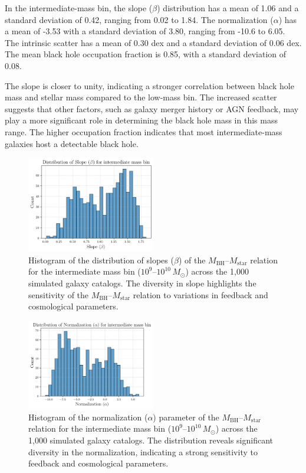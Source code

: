 \documentclass[twocolumn]{aastex631}
\begin{document}
In the intermediate-mass bin, the slope ($\beta$) distribution has a mean of 1.06 and a standard deviation of 0.42, ranging from 0.02 to 1.84. The normalization ($\alpha$) has a mean of -3.53 with a standard deviation of 3.80, ranging from -10.6 to 6.05. The intrinsic scatter has a mean of 0.30 dex and a standard deviation of 0.06 dex. The mean black hole occupation fraction is 0.85, with a standard deviation of 0.08.

The slope is closer to unity, indicating a stronger correlation between black hole mass and stellar mass compared to the low-mass bin. The increased scatter suggests that other factors, such as galaxy merger history or AGN feedback, may play a more significant role in determining the black hole mass in this mass range. The higher occupation fraction indicates that most intermediate-mass galaxies host a detectable black hole.

\begin{figure}[ht!]
    \centering
    \includegraphics[width=0.5\textwidth]{plots/dist_beta_intermediate_42_20250423_182544.png}
    \caption{Histogram of the distribution of slopes ($\beta$) of the $M_\mathrm{BH}$--$M_\mathrm{star}$ relation for the intermediate mass bin ($10^9$--$10^{10}\,M_\odot$) across the 1,000 simulated galaxy catalogs. The diversity in slope highlights the sensitivity of the $M_\mathrm{BH}$--$M_\mathrm{star}$ relation to variations in feedback and cosmological parameters.
}
    \label{fig:dist_beta_intermediate}
\end{figure}

\begin{figure}[ht!]
    \centering
    \includegraphics[width=0.5\textwidth]{plots/dist_alpha_intermediate_43_20250423_182545.png}
    \caption{Histogram of the normalization ($\alpha$) parameter of the $M_\mathrm{BH}$--$M_\mathrm{star}$ relation for the intermediate mass bin ($10^9$--$10^{10}\,M_\odot$) across the 1,000 simulated galaxy catalogs. The distribution reveals significant diversity in the normalization, indicating a strong sensitivity to feedback and cosmological parameters.
}
    \label{fig:dist_alpha_intermediate}
\end{figure}
\end{document}
